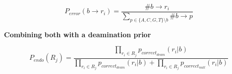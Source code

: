\documentclass[a4paper,12pt]{article}
\begin{document}
\begin{equation}
  P_{error}(  b \to r_i )  = \frac { \# b \to r_i } { \sum\limits_{p \in \{ A,C,G,T \} \setminus b } \# b \to p }
\end{equation}




%
%
%
%
%
%
%
%
%

{\bf Combining both with a deamination prior}


\begin{equation}
P_{endo}(R_j) = \frac { \prod\limits_{r_i \in R_j} p_{correct_{deam}}(r_i|b) } { \prod\limits_{r_i \in R_j} p_{correct_{deam}}(r_i|b) + \prod\limits_{r_i \in R_j} p_{correct_{null}}(r_i|b) }
\end{equation}
\end{document}

